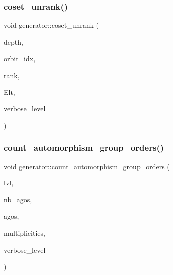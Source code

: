 \mbox{\label{classgenerator_a489f02ee804f130f666029a46020aaf6}} 
\subsubsection{\texorpdfstring{coset\+\_\+unrank()}{coset\_unrank()}}
{\footnotesize\ttfamily void generator\+::coset\+\_\+unrank (\begin{DoxyParamCaption}\item[{\mbox{\hyperlink{galois_8h_a09fddde158a3a20bd2dcadb609de11dc}{I\+NT}}}]{depth,  }\item[{\mbox{\hyperlink{galois_8h_a09fddde158a3a20bd2dcadb609de11dc}{I\+NT}}}]{orbit\+\_\+idx,  }\item[{\mbox{\hyperlink{galois_8h_a09fddde158a3a20bd2dcadb609de11dc}{I\+NT}}}]{rank,  }\item[{\mbox{\hyperlink{galois_8h_a09fddde158a3a20bd2dcadb609de11dc}{I\+NT}} $\ast$}]{Elt,  }\item[{\mbox{\hyperlink{galois_8h_a09fddde158a3a20bd2dcadb609de11dc}{I\+NT}}}]{verbose\+\_\+level }\end{DoxyParamCaption})}

\mbox{\label{classgenerator_a24c0a9c37f0b2f68c29a9981edce482c}} 
\subsubsection{\texorpdfstring{count\+\_\+automorphism\+\_\+group\+\_\+orders()}{count\_automorphism\_group\_orders()}}
{\footnotesize\ttfamily void generator\+::count\+\_\+automorphism\+\_\+group\+\_\+orders (\begin{DoxyParamCaption}\item[{\mbox{\hyperlink{galois_8h_a09fddde158a3a20bd2dcadb609de11dc}{I\+NT}}}]{lvl,  }\item[{\mbox{\hyperlink{galois_8h_a09fddde158a3a20bd2dcadb609de11dc}{I\+NT}} \&}]{nb\+\_\+agos,  }\item[{\mbox{\hyperlink{classlonginteger__object}{longinteger\+\_\+object}} $\ast$\&}]{agos,  }\item[{\mbox{\hyperlink{galois_8h_a09fddde158a3a20bd2dcadb609de11dc}{I\+NT}} $\ast$\&}]{multiplicities,  }\item[{\mbox{\hyperlink{galois_8h_a09fddde158a3a20bd2dcadb609de11dc}{I\+NT}}}]{verbose\+\_\+level }\end{DoxyParamCaption})}

